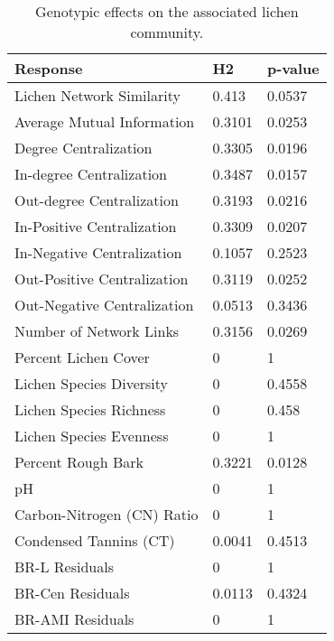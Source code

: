 \begin{table}[ht]
\centering
\begin{tabular}{lll}
  \hline
Response & H2 & p-value \\ 
  \hline
Lichen Network Similarity & 0.413 & 0.0537 \\ 
  Average Mutual Information & 0.3101 & 0.0253 \\ 
  Degree Centralization & 0.3305 & 0.0196 \\ 
  In-degree Centralization & 0.3487 & 0.0157 \\ 
  Out-degree Centralization & 0.3193 & 0.0216 \\ 
  In-Positive Centralization & 0.3309 & 0.0207 \\ 
  In-Negative Centralization & 0.1057 & 0.2523 \\ 
  Out-Positive Centralization & 0.3119 & 0.0252 \\ 
  Out-Negative Centralization & 0.0513 & 0.3436 \\ 
  Number of Network Links & 0.3156 & 0.0269 \\ 
  Percent Lichen Cover & 0 & 1 \\ 
  Lichen Species Diversity & 0 & 0.4558 \\ 
  Lichen Species Richness & 0 & 0.458 \\ 
  Lichen Species Evenness & 0 & 1 \\ 
  Percent Rough Bark & 0.3221 & 0.0128 \\ 
  pH & 0 & 1 \\ 
  Carbon-Nitrogen (CN) Ratio & 0 & 1 \\ 
  Condensed Tannins (CT) & 0.0041 & 0.4513 \\ 
  BR-L Residuals & 0 & 1 \\ 
  BR-Cen Residuals & 0.0113 & 0.4324 \\ 
  BR-AMI Residuals & 0 & 1 \\ 
   \hline
\end{tabular}
\caption{Genotypic effects on the associated lichen community.} 
\label{tab:h2_table}
\end{table}
